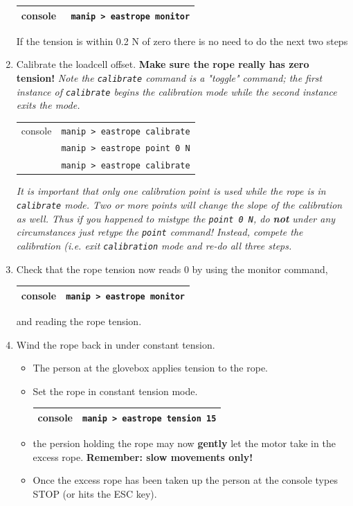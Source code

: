 \begin{enumerate}
\begin{center}
\begin{tabular}{|c|c|}
\hline
console & \verb+ manip > eastrope monitor+ \\
\hline
\end{tabular}
\end{center}
If the tension is within 0.2 N of zero there is no need to do the next two steps
\item \CheckBox[name=cesr5]{} Calibrate the loadcell offset. {\bf Make sure the rope really has zero tension!} {\it Note the \verb+calibrate+ command is a "toggle" command; the first instance of \verb+calibrate+ begins the calibration mode while the second instance exits the mode.}
\begin{center}
	\begin{tabular}{|c|c|}
	\hline
	console & \verb+manip > eastrope calibrate+ \\
	              & \verb+manip > eastrope point 0 N+ \\
	              & \verb+manip > eastrope calibrate+ \\
	           \hline
	\end{tabular}
	\end{center}
{\it It is important that only one calibration point is used while the rope is in \verb+calibrate+ mode. Two or more points will change the slope of the calibration as well. Thus if you happened to mistype the \verb+point 0 N+, do {\bf not} under any circumstances just retype the \verb+point+ command! Instead, compete the calibration (i.e. exit \verb+calibration+ mode and re-do all three steps.}
\item \CheckBox[name=cesr6]{} Check that the rope tension now reads 0 by using the monitor command,
\begin{center}
\begin{tabular}{|c|c|}
\hline
console & \verb+manip > eastrope monitor+ \\
\hline
\end{tabular}
\end{center}
and reading the rope tension.
\item \CheckBox[name=cesr7]{} Wind the rope back in under constant tension.
\begin{itemize}
\item The person at the glovebox applies tension to the rope.
\item Set the rope in constant tension mode.
\begin{center}
\begin{tabular}{|c|c|}
\hline
console & \verb+manip > eastrope tension 15+ \\
\hline
\end{tabular}
\end{center}
\item the persion holding the rope may now {\bf gently} let the motor take in the excess rope. {\bf Remember: slow movements only!}
\item Once the excess rope has been taken up the person at the console types STOP (or hits the ESC key).
\end{itemize}
\end{enumerate}
